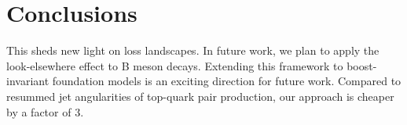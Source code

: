 \section{Conclusions}\label{sec:conclusions}

This sheds new light on loss landscapes. In future work, we plan to
apply the look-elsewhere effect to B meson decays. Extending this
framework to boost-invariant foundation models is an exciting direction
for future work. Compared to resummed jet angularities of top-quark pair
production, our approach is cheaper by a factor of 3.

